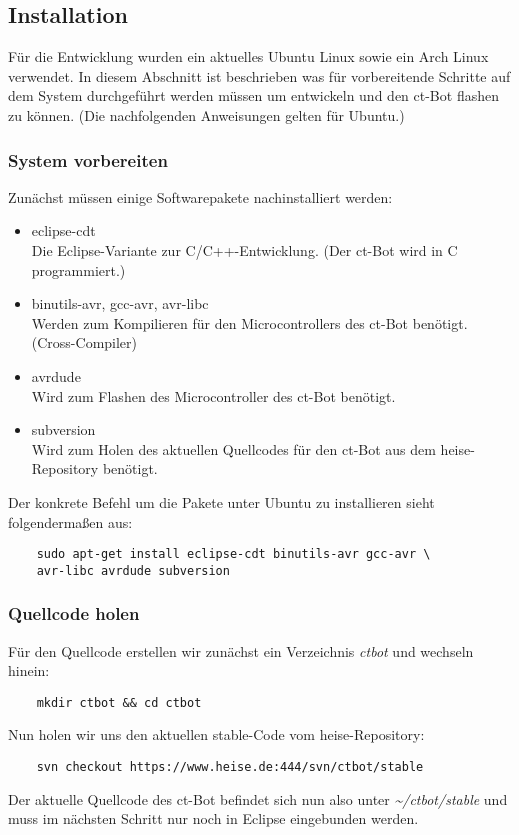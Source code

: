 \subsection{Installation}
Für die Entwicklung wurden ein aktuelles Ubuntu Linux sowie ein Arch Linux verwendet. In diesem Abschnitt ist beschrieben was für vorbereitende Schritte auf dem System durchgeführt werden müssen um entwickeln und den ct-Bot flashen zu können.
(Die nachfolgenden Anweisungen gelten für Ubuntu.)


\subsubsection{System vorbereiten}
Zunächst müssen einige Softwarepakete nachinstalliert werden:
\begin{itemize}
\item eclipse-cdt\\
Die Eclipse-Variante zur C/C++-Entwicklung. (Der ct-Bot wird in C programmiert.)
\item binutils-avr, gcc-avr, avr-libc\\
Werden zum Kompilieren für den Microcontrollers des ct-Bot benötigt. (Cross-Compiler)
\item avrdude\\
Wird zum Flashen des Microcontroller des ct-Bot benötigt.
\item subversion\\
Wird zum Holen des aktuellen Quellcodes für den ct-Bot aus dem heise-Repository benötigt.
\end{itemize}
Der konkrete Befehl um die Pakete unter Ubuntu zu installieren sieht folgendermaßen aus:
\begin{lstlisting}
	sudo apt-get install eclipse-cdt binutils-avr gcc-avr \
	avr-libc avrdude subversion
\end{lstlisting}


\subsubsection{Quellcode holen}
Für den Quellcode erstellen wir zunächst ein Verzeichnis \textit{ctbot} und wechseln hinein:
\begin{lstlisting}
	mkdir ctbot && cd ctbot
\end{lstlisting}
Nun holen wir uns den aktuellen stable-Code vom heise-Repository:
\begin{lstlisting}
	svn checkout https://www.heise.de:444/svn/ctbot/stable
\end{lstlisting}
Der aktuelle Quellcode des ct-Bot befindet sich nun also unter \textit{\~{}/ctbot/stable} und muss im nächsten Schritt nur noch in Eclipse eingebunden werden.


